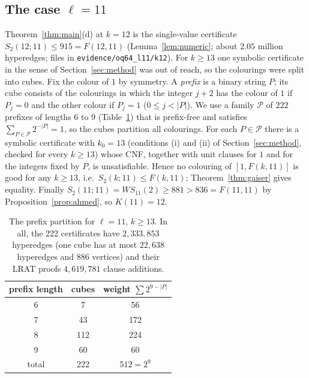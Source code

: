 \documentclass[11pt]{amsart}
\theoremstyle{definition}
\newcommand{\F}{F}
\newcommand{\Stwo}{S_2}
\begin{document}
\subsection{The case $\ell=11$}\label{sec:l11}
Theorem~\ref{thm:main}(d) at $k=12$ is the single-value certificate $\Stwo(12;11)\le915=\F(12,11)$ (Lemma~\ref{lem:numeric}; about $2.05$ million hyperedges; files in \texttt{evidence/oq64\_l11/k12}). For $k\ge13$ one symbolic certificate in the sense of Section~\ref{sec:method} was out of reach, so the colourings were split into cubes. Fix the colour of $1$ by symmetry. A \emph{prefix} is a binary string $P$; its cube consists of the colourings in which the integer $j+2$ has the colour of $1$ if $P_j=0$ and the other colour if $P_j=1$ ($0\le j<|P|$). We use a family $\mathcal P$ of $222$ prefixes of lengths $6$ to $9$ (Table~\ref{tab:t19}) that is prefix-free and satisfies $\sum_{P\in\mathcal P}2^{-|P|}=1$, so the cubes partition all colourings. For each $P\in\mathcal P$ there is a symbolic certificate with $k_0=13$ (conditions (i) and (ii) of Section~\ref{sec:method}, checked for every $k\ge13$) whose CNF, together with unit clauses for $1$ and for the integers fixed by $P$, is unsatisfiable. Hence no colouring of $[1,\F(k,11)]$ is good for any $k\ge13$, i.e.\ $\Stwo(k;11)\le\F(k,11)$; Theorem~\ref{thm:gaiser} gives equality. Finally $\Stwo(11;11)=WS_{11}(2)\ge881>836=\F(11,11)$ by Proposition~\ref{prop:ahmed}, so $K(11)=12$.

\begin{table}[h]
\centering
\begin{tabular}{ccc}
\toprule
prefix length & cubes & weight $\sum 2^{9-|P|}$\\
\midrule
6 & 7 & 56\\
7 & 43 & 172\\
8 & 112 & 224\\
9 & 60 & 60\\
\midrule
total & 222 & $512=2^9$\\
\bottomrule
\end{tabular}
\caption{The prefix partition for $\ell=11$, $k\ge13$. In all, the 222 certificates have $2{,}333{,}853$ hyperedges (one cube has at most $22{,}638$ hyperedges and $886$ vertices) and their LRAT proofs $4{,}619{,}781$ clause additions.}
\label{tab:t19}
\end{table}
\end{document}
